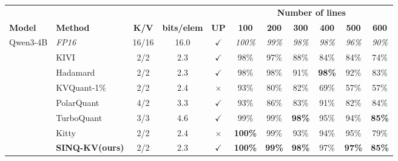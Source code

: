\documentclass{llmxive}
\providecommand{\ours}[1]{\cellcolor{customblue!30}#1}
\providecommand{\others}[1]{\cellcolor{gray!10}#1}
\providecommand{\methodname}{SINQ-KV\xspace}
\begin{document}
\begin{table}[t]
\centering
\begin{threeparttable}
\small
\setlength{\tabcolsep}{3pt}
\begin{tabular}{l l c c c c c c c c c}
\toprule
& & & & & \multicolumn{6}{c}{\textbf{Number of lines}} \\
\cmidrule(lr){6-11}
\textbf{Model} & \textbf{Method} 
& \textbf{K/V}
& \textbf{bits/elem}
& \textbf{UP}
& \textbf{100} & \textbf{200} & \textbf{300} & \textbf{400} & \textbf{500} & \textbf{600} \\
\midrule

\multirow{8}{*}{Qwen3-4B}
 & \textit{FP16} & 16/16 & 16.0 & $\checkmark$
   & \textit{100\%} & \textit{99\%} & \textit{98\%} & \textit{98\%} & \textit{96\%} & \textit{90\%} \\
\cmidrule(lr){2-11}
 & \others{KIVI} & \others{2/2} & \others{2.3} & \others{$\checkmark$} & \others{98\%} & \others{97\%} & \others{88\%} & \others{84\%} & \others{84\%} & \others{74\%} \\
 & \others{Hadamard} & \others{2/2} & \others{2.3} & \others{$\checkmark$} & \others{98\%} & \others{98\%} & \others{91\%} & \others{\textbf{98\%}} & \others{92\%} & \others{83\%} \\
 & \others{KVQuant-1\%} & \others{2/2} & \others{2.4} & \others{$\times$} & \others{93\%} & \others{80\%} & \others{82\%} & \others{69\%} & \others{57\%} & \others{57\%} \\
 & \others{PolarQuant} & \others{4/2} & \others{3.3} & \others{$\checkmark$} & \others{93\%} & \others{86\%} & \others{83\%} & \others{91\%} & \others{82\%} & \others{84\%} \\
 & \others{TurboQuant\tnote{1}} & \others{3/3} & \others{4.6} & \others{$\checkmark$} & \others{99\%} & \others{99\%} & \others{\textbf{98\%}} & \others{95\%} & \others{94\%} & \others{\textbf{85\%}} \\
 & \others{Kitty} & \others{2/2} & \others{2.4} & \others{$\times$} & \others{\textbf{100\%}} & \others{99\%} & \others{93\%} & \others{94\%} & \others{95\%} & \others{79\%} \\
 & \textbf{\ours{\methodname (ours)}} 
   & \ours{2/2} & \ours{2.3} & \ours{$\checkmark$}
   & \ours{\textbf{100\%}} & \ours{\textbf{99\%}} & \ours{\textbf{98\%}} & \ours{97\%} & \ours{\textbf{97\%}} & \ours{\textbf{85\%}} \\

\midrule


\end{tabular}
\end{threeparttable}
\end{table}
\end{document}
